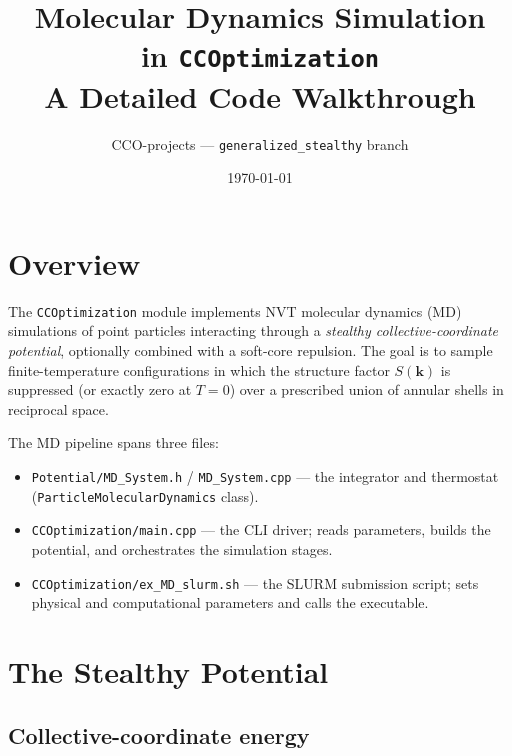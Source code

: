 \documentclass[12pt,a4paper]{article}
\title{\textbf{Molecular Dynamics Simulation\\
in \texttt{CCOptimization}}\\[0.5em]
\large A Detailed Code Walkthrough}
\author{CCO-projects --- \texttt{generalized\_stealthy} branch}
\date{\today}
\begin{document}
\maketitle
\tableofcontents
\newpage

\section{Overview}

The \texttt{CCOptimization} module implements NVT molecular dynamics (MD)
simulations of point particles interacting through a \emph{stealthy
collective-coordinate potential}, optionally combined with a soft-core
repulsion. The goal is to sample finite-temperature configurations in which
the structure factor $S(\mathbf{k})$ is suppressed (or exactly zero at $T=0$)
over a prescribed union of annular shells in reciprocal space.

The MD pipeline spans three files:
\begin{itemize}
    \item \texttt{Potential/MD\_System.h} / \texttt{MD\_System.cpp} ---
          the integrator and thermostat (\texttt{ParticleMolecularDynamics} class).
    \item \texttt{CCOptimization/main.cpp} --- the CLI driver; reads parameters,
          builds the potential, and orchestrates the simulation stages.
    \item \texttt{CCOptimization/ex\_MD\_slurm.sh} --- the SLURM submission
          script; sets physical and computational parameters and calls the
          executable.
\end{itemize}

\section{The Stealthy Potential}

\subsection{Collective-coordinate energy}
\end{document}
